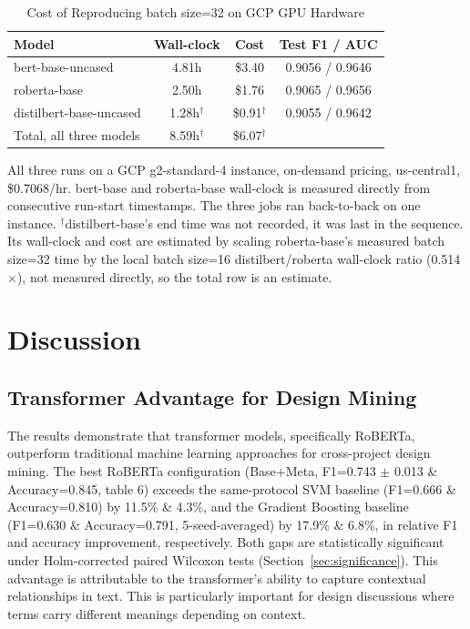 \documentclass[preprint,12pt]{elsarticle}
\begin{document}
\begin{table}[t]
\centering
\caption{Cost of Reproducing batch size=32 on GCP GPU Hardware}
\label{tab:batch32cost}
\setlength{\tabcolsep}{4pt}
\begin{tabular}{lccc}
\toprule
\textbf{Model} & \textbf{Wall-clock} & \textbf{Cost} & \textbf{Test F1 / AUC} \\
\midrule
bert-base-uncased & 4.81h & \$3.40 & 0.9056 / 0.9646 \\
roberta-base & 2.50h & \$1.76 & 0.9065 / 0.9656 \\
distilbert-base-uncased & 1.28h$^\dagger$ & \$0.91$^\dagger$ & 0.9055 / 0.9642 \\
\midrule
Total, all three models & 8.59h$^\dagger$ & \$6.07$^\dagger$ & \\
\bottomrule
\end{tabular}
\begin{flushleft}
\footnotesize All three runs on a GCP g2-standard-4 instance, on-demand pricing, us-central1, \$0.7068/hr.  bert-base and roberta-base wall-clock is measured directly from consecutive run-start timestamps. The three jobs ran back-to-back on one instance. $^\dagger$distilbert-base's end time was not recorded, it was last in the sequence. Its wall-clock and cost are estimated by scaling roberta-base's measured batch size=32 time by the local batch size=16 distilbert/roberta wall-clock ratio (0.514$\times$), not measured directly, so the total row is an estimate. 
\end{flushleft}
\end{table}

\section{Discussion}
\label{sec:discussion}

\subsection{Transformer Advantage for Design Mining}

The results demonstrate that transformer models, specifically RoBERTa, outperform traditional machine learning approaches for cross-project design mining. The best RoBERTa configuration (Base+Meta, F1=0.743 $\pm$ 0.013 \& Accuracy=0.845, table 6) exceeds the same-protocol SVM baseline (F1=0.666 \& Accuracy=0.810) by 11.5\% \& 4.3\%, and the Gradient Boosting baseline (F1=0.630 \& Accuracy=0.791, 5-seed-averaged) by 17.9\% \& 6.8\%, in relative F1 and accuracy improvement, respectively. Both gaps are statistically significant under Holm-corrected paired Wilcoxon tests (Section~\ref{sec:significance}). This advantage is attributable to the transformer's ability to capture contextual relationships in text. This is particularly important for design discussions where terms carry different meanings depending on context.
\end{document}

